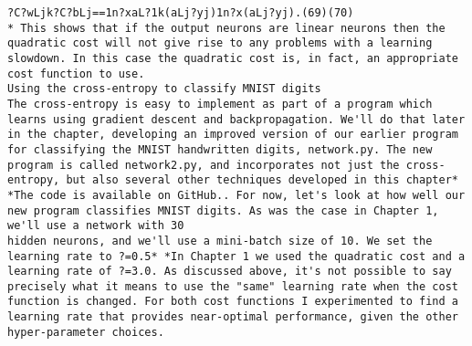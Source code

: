 \begin{lstlisting}
?C?wLjk?C?bLj==1n?xaL?1k(aLj?yj)1n?x(aLj?yj).(69)(70)
* This shows that if the output neurons are linear neurons then the quadratic cost will not give rise to any problems with a learning slowdown. In this case the quadratic cost is, in fact, an appropriate cost function to use. 
Using the cross-entropy to classify MNIST digits
The cross-entropy is easy to implement as part of a program which learns using gradient descent and backpropagation. We'll do that later in the chapter, developing an improved version of our earlier program for classifying the MNIST handwritten digits, network.py. The new program is called network2.py, and incorporates not just the cross-entropy, but also several other techniques developed in this chapter* *The code is available on GitHub.. For now, let's look at how well our new program classifies MNIST digits. As was the case in Chapter 1, we'll use a network with 30
hidden neurons, and we'll use a mini-batch size of 10. We set the learning rate to ?=0.5* *In Chapter 1 we used the quadratic cost and a learning rate of ?=3.0. As discussed above, it's not possible to say precisely what it means to use the "same" learning rate when the cost function is changed. For both cost functions I experimented to find a learning rate that provides near-optimal performance, given the other hyper-parameter choices. 


\end{lstlisting}
